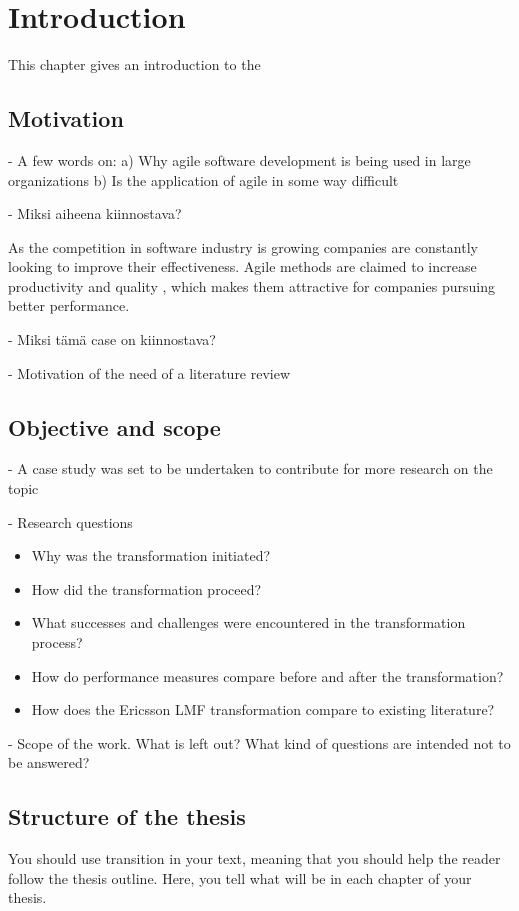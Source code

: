 
\chapter{Introduction}
\label{chapter:intro}

This chapter gives an introduction to the

\section{Motivation}

- A few words on:
a) Why agile software development is being used in large organizations
b) Is the application of agile in some way difficult

- Miksi aiheena kiinnostava?

As the competition in software industry is growing companies are constantly
looking to improve their effectiveness. Agile methods are claimed to increase
productivity and quality \cite{Livermore2008}, which makes them attractive
for companies pursuing better performance.

- Miksi tämä case on kiinnostava?

- Motivation of the need of a literature review


\section{Objective and scope}

- A case study was set to be undertaken to contribute for more research on the topic

- Research questions

\begin{itemize}
  \item Why was the transformation initiated?
  \item How did the transformation proceed?
  \item What successes and challenges were encountered in the transformation
        process?
  \item How do performance measures compare before and after the transformation?
  \item How does the Ericsson LMF transformation compare to existing literature?
\end{itemize}

- Scope of the work.
What is left out?
What kind of questions are intended not to be answered?


\section{Structure of the thesis}

You should use transition in your text, meaning that you should help
the reader follow the thesis outline. Here, you tell what will be in
each chapter of your thesis. 

